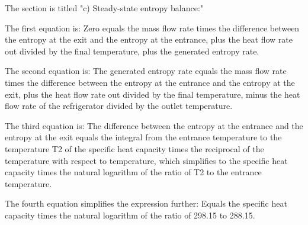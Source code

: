 The section is titled "c) Steady-state entropy balance:"

The first equation is:
Zero equals the mass flow rate times the difference between the entropy at the exit and the entropy at the entrance, plus the heat flow rate out divided by the final temperature, plus the generated entropy rate.

The second equation is:
The generated entropy rate equals the mass flow rate times the difference between the entropy at the entrance and the entropy at the exit, plus the heat flow rate out divided by the final temperature, minus the heat flow rate of the refrigerator divided by the outlet temperature.

The third equation is:
The difference between the entropy at the entrance and the entropy at the exit equals the integral from the entrance temperature to the temperature T2 of the specific heat capacity times the reciprocal of the temperature with respect to temperature, which simplifies to the specific heat capacity times the natural logarithm of the ratio of T2 to the entrance temperature.

The fourth equation simplifies the expression further:
Equals the specific heat capacity times the natural logarithm of the ratio of 298.15 to 288.15.